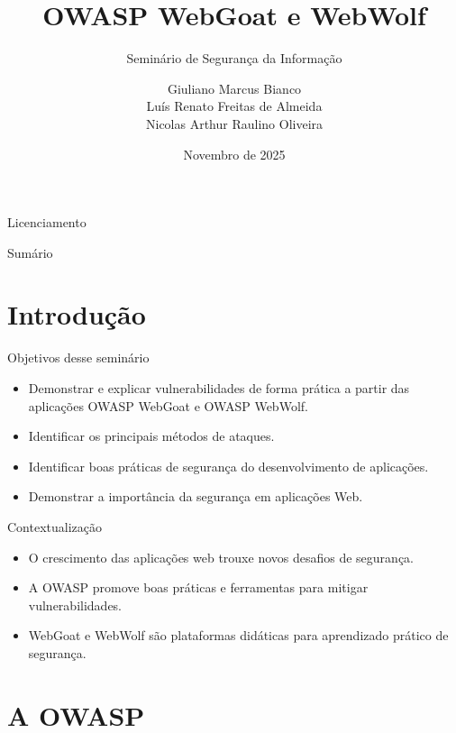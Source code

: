 \documentclass[aspectratio=169]{beamer}
\title{OWASP WebGoat e WebWolf}
\subtitle{Seminário de Segurança da Informação}
\author{
  Giuliano Marcus Bianco \\[3pt]
  Luís Renato Freitas de Almeida \\[3pt]
  Nicolas Arthur Raulino Oliveira
}
\institute{Instituto Federal de Santa Catarina}
\date{Novembro de 2025}
\begin{document}
\begin{frame}
    \maketitle
\end{frame}

\begin{frame}{Licenciamento}
    \licenciamentoLivre
\end{frame}
\begin{frame}{Sumário}
    \tableofcontents
\end{frame}

\section{Introdução}
\begin{frame}{Objetivos desse seminário}
    \begin{itemize}
        \item Demonstrar e explicar vulnerabilidades de forma prática a partir das aplicações OWASP WebGoat e OWASP WebWolf.
        \item Identificar os principais métodos de ataques.
        \item Identificar boas práticas de segurança do desenvolvimento de aplicações.
        \item Demonstrar a importância da segurança em aplicações Web.
    \end{itemize}
\end{frame}
\begin{frame}{Contextualização}
    \begin{itemize}
        \item O crescimento das aplicações web trouxe novos desafios de segurança.
        \item A OWASP promove boas práticas e ferramentas para mitigar vulnerabilidades.
        \item WebGoat e WebWolf são plataformas didáticas para aprendizado prático de segurança.
    \end{itemize}
\end{frame}
	
\section{A OWASP}
\end{document}
